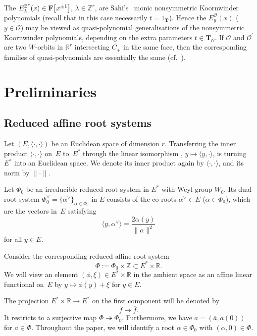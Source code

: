 \documentclass[pdftex]{sigma}
\numberwithin{equation}{section}
\begin{document}
{The $E_\lambda^{\mathbb{Z}^r}(x)\in\mathbf{F}\smash{\bigl[x^{\pm 1}\bigr]}$, $\lambda\in\mathbb{Z}^r$, are Sahi's~\cite{Sa} monic nonsymmetric Koornwinder polynomials (recall that in this case necessarily $t=1_{\mathbf{T}}$). Hence the $E_y^\mathcal{O}(x)$ ($y\in\mathcal{O}$) may be viewed as quasi-polynomial generalisations of the nonsymmetric Koornwinder polynomials, depending on the extra parameters $t\in\mathbf{T}_\mathcal{O}$.
If $\mathcal{O}$ and $\mathcal{O}^\prime$ are two $W$-orbits in $\mathbb{R}^r$ intersecting $\overline{C_+}$ in the same face, then the corresponding families of quasi-polynomials are essentially the same (cf.~\cite[Theorem~6.2\,(4)]{SSV2}).

}


\section{Preliminaries}\label{prel}

\subsection{Reduced affine root systems}

Let $(E,\langle\cdot,\cdot\rangle)$ be an Euclidean space of dimension $r$. Transferring the inner product $\langle\cdot,\cdot\rangle$ on~$E$ to~$E^*$ through the linear isomorphism , $y\mapsto \langle y,\cdot\rangle$, is turning $E^*$ into an Euclidean space. We denote its inner product again by $\langle\cdot,\cdot\rangle$, and its norm by $\|\cdot\|$.

Let $\Phi_0$ be an irreducible reduced root system in $E^*$ with Weyl group $W_0$. Its dual root system $\Phi_0^\vee=\{\alpha^\vee\}_{\alpha\in\Phi_0}$ in $E$ consists of the co-roots $\alpha^\vee\in E$ ($\alpha\in\Phi_0$), which are the vectors in~$E$ satisfying
\begin{equation}\label{corootdef}
\bigl\langle y,\alpha^\vee\bigr\rangle=\frac{2\alpha(y)}{\|\alpha\|^2}
\end{equation}
for all $y\in E$.

Consider the corresponding reduced affine root system
\[
\Phi:=\Phi_0\times \mathbb{Z}\subset E^*\times\mathbb{R}.
\]
We will view an element $(\phi,\xi)\in E^*\times\mathbb{R}$ in the ambient space as an affine linear functional on~$E$ by $y\mapsto\phi(y)+\xi$ for $y\in E$.

The projection $E^*\times\mathbb{R}\rightarrow E^*$ on the first component will be denoted by
\[
f\mapsto\overline{f}.
\]
It restricts to a surjective map $\Phi\twoheadrightarrow\Phi_0$. Furthermore, we have $a=(\overline{a},a(0))$ for $a\in\Phi$.
Throughout the paper, we will identify a root $\alpha\in\Phi_0$ with $(\alpha,0)\in\Phi$.
\end{document}

